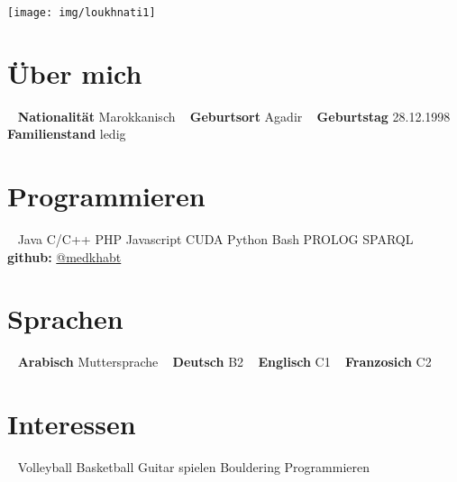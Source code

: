 \documentclass[oneside]{friggeri-cv}
\begin{document}



\begin{aside}
  \texttt{[image: img/loukhnati1]}
\section{Über mich}
~  
\textbf{Nationalität}
   Marokkanisch
   ~
  \textbf{Geburtsort}
   Agadir 
  ~
  \textbf{Geburtstag}
  28.12.1998
  ~  
  \textbf{Familienstand}
  ledig 
  \section{Programmieren}
	  ~
	Java
        C/C++
        PHP
        Javascript
        CUDA
        Python
        Bash
        PROLOG
        SPARQL
	  ~
    \textbf{github:} 
    \href{https://github.com/medkhabt/}{@medkhabt}
     \section{Sprachen}
	  ~
    \textbf{Arabisch}
    Muttersprache
    ~
    \textbf{Deutsch}
    B2 
    ~
    \textbf{Englisch}
    C1 
    ~
    \textbf{Franzosich}
    C2 
 \section{Interessen}
 ~
 Volleyball
 Basketball 
 Guitar spielen
 Bouldering
 Programmieren
\end{aside}
\end{document}
